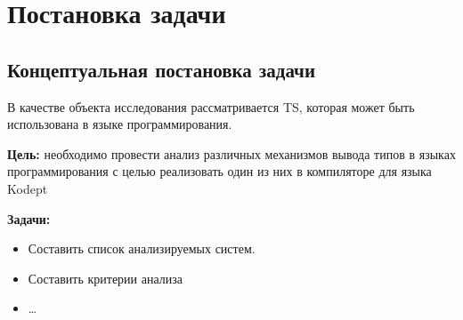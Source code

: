 \chapter{Постановка задачи}
\label{ch:task_statement}
\section{Концептуальная постановка задачи}
\label{sec:abstract_task_statement}

В качестве объекта исследования рассматривается \gls{TS}, которая может быть использована в языке программирования.

\textbf{Цель:} необходимо провести анализ различных механизмов вывода типов в языках программирования с целью реализовать один из них в компиляторе для языка \gls{Kodept}

\textbf{Задачи:}
\begin{itemize}
    \item Составить список анализируемых систем.
    \item Составить критерии анализа
    \item \ldots
\end{itemize}



